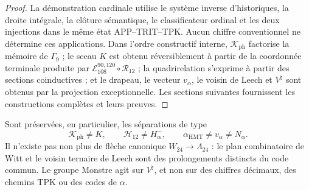 \begin{proof}
La démonstration cardinale utilise le système inverse d'historiques, la droite intégrale, la clôture sémantique, le classificateur ordinal et les deux injections dans le même état APP--TRIT--TPK. Aucun chiffre conventionnel ne détermine ces applications. Dans l'ordre constructif interne, \(\mathcal K_{\mathrm{ph}}\) factorise la mémoire de \(\Gamma_9\) ; le sceau \(K\) est obtenu réversiblement à partir de la coordonnée terminale produite par \(\mathcal E_{108}^{90,120}\circ\mathcal R_{12}\) ; la quadrirelation s'exprime à partir des sections coinductives ; et le drapeau, le vecteur \(v_\alpha\), le voisin de Leech et \(V^\natural\) sont obtenus par la projection exceptionnelle. Les sections suivantes fournissent les constructions complètes et leurs preuves.
\end{proof}

Sont préservées, en particulier, les séparations de type
\[
 \mathcal K_{\mathrm{ph}}\neq K,\qquad
 \mathcal H_{12}\neq H^-_\alpha,\qquad
 \alpha_{\mathrm{HMT}}\neq v_\alpha\neq N_\alpha.
\]
Il n'existe pas non plus de flèche canonique \(W_{24}\to\Lambda_{24}\) : le plan combinatoire de Witt et le voisin ternaire de Leech sont des prolongements distincts du code commun. Le groupe Monstre agit sur \(V^\natural\), et non sur des chiffres décimaux, des chemins TPK ou des codes de \(\alpha\).
